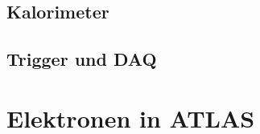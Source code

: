 \subsection{Kalorimeter}
\label{calorimeter}






\subsection{Trigger und DAQ}
\label{trigger_daq}







%
\section{Elektronen in ATLAS}
\label{electrons}



